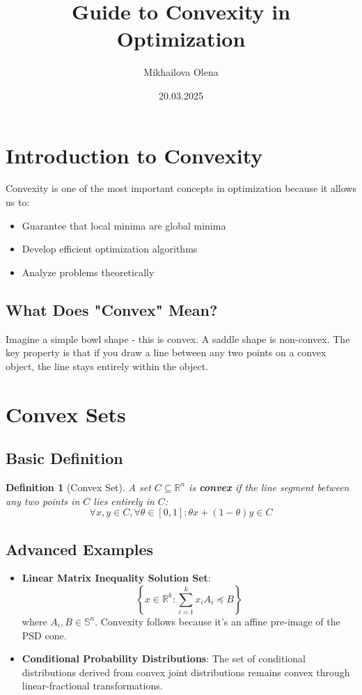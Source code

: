 \documentclass{article}
\title{Guide to Convexity in Optimization}
\author{Mikhailova Olena}
\date{20.03.2025}
\theoremstyle{plain}
\newtheorem{definition}[theorem]{Definition}
\begin{document}
\maketitle

\section{Introduction to Convexity}
Convexity is one of the most important concepts in optimization because it allows us to:
\begin{itemize}
    \item Guarantee that local minima are global minima
    \item Develop efficient optimization algorithms
    \item Analyze problems theoretically
\end{itemize}

\subsection{What Does "Convex" Mean?}
Imagine a simple bowl shape - this is convex. A saddle shape is non-convex. The key property is that if you draw a line between any two points on a convex object, the line stays entirely within the object.

\section{Convex Sets}
\subsection{Basic Definition}
\begin{definition}[Convex Set]
A set \( C \subseteq \mathbb{R}^n \) is \textbf{convex} if the line segment between any two points in \( C \) lies entirely in \( C \):
\[
\forall x,y \in C, \forall \theta \in [0,1]: \theta x + (1-\theta)y \in C
\]
\end{definition}

\subsection{Advanced Examples} %
\begin{itemize}
    \item \textbf{Linear Matrix Inequality Solution Set}:
    \[
    \left\{x \in \mathbb{R}^k : \sum_{i=1}^k x_i A_i \preceq B\right\}
    \]
    where \( A_i, B \in \mathbb{S}^n \). Convexity follows because it's an affine pre-image of the PSD cone.
    
    \item \textbf{Conditional Probability Distributions}:
    The set of conditional distributions derived from convex joint distributions remains convex through linear-fractional transformations.
\end{itemize}
\end{document}
